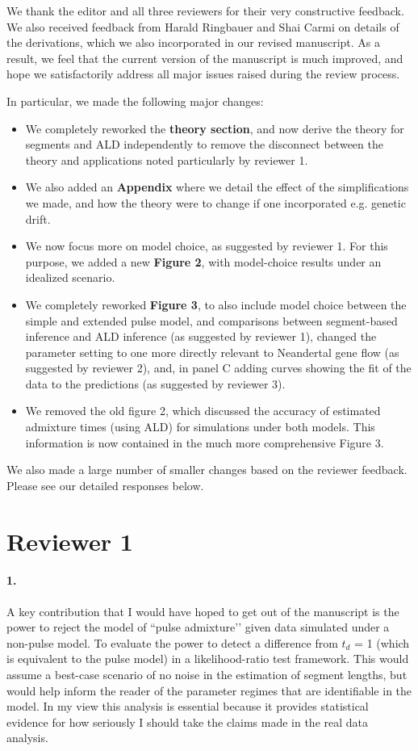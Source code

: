 \documentclass[11pt]{article}
\let\oldparagraph\paragraph
\renewcommand{\paragraph}[1]{\oldparagraph{#1}\mbox{}}
\begin{document}
We thank the editor and all three reviewers for their very constructive feedback. We also received feedback from Harald Ringbauer and Shai Carmi on details of the derivations, which we also incorporated in our revised manuscript. As a result, we feel that the current version of the manuscript is much improved, and hope we satisfactorily address all major issues raised during the review process.

In particular, we made the following major changes:
\begin{itemize}
    \item We completely reworked the \textbf{theory section}, and now derive the theory for segments and ALD independently to remove the disconnect between the theory and applications noted particularly by reviewer 1. 
    \item We also added an \textbf{Appendix} where we detail the effect of the simplifications we made, and how the theory were to change if one incorporated e.g. genetic drift.
    \item We now focus more on model choice, as suggested by reviewer 1. For this purpose, we added a new \textbf{Figure 2}, with model-choice results under an idealized scenario. 
    \item We completely reworked \textbf{Figure 3}, to also include model choice between the simple and extended pulse model, and comparisons between segment-based inference and ALD inference (as suggested by reviewer 1), changed the parameter setting to one more directly relevant to Neandertal gene flow (as suggested by reviewer 2), and, in panel C adding curves showing the fit of the data to the predictions (as suggested by reviewer 3).
    \item We removed the old figure 2, which discussed the accuracy of estimated admixture times (using ALD) for simulations under both models. This information is now contained in the much more comprehensive Figure 3. 
\end{itemize}

We also made a large number of smaller changes based on the reviewer feedback. Please see our detailed responses below.

\section{Reviewer 1}\label{Reviewer 1}

\paragraph{1.}
A key contribution that I would have hoped to get out of the manuscript is the power to reject the model of ``pulse admixture’’ given data simulated under a non-pulse model. To evaluate the power to detect a difference from $t_d$ = 1 (which is equivalent to the pulse model) in a likelihood-ratio test framework. This would assume a best-case scenario of no noise in the estimation of segment lengths, but would help inform the reader of the parameter regimes that are identifiable in the model. In my view this analysis is essential because it provides statistical evidence for how seriously I should take the claims made in the real data analysis.
\end{document}

